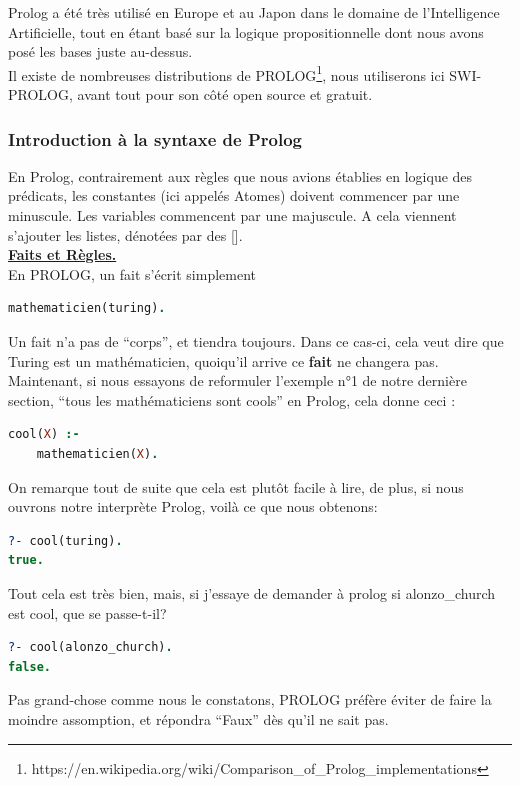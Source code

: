 \documentclass[a4paper, 12pt]{article}
\numberwithin{equation}{subsection}
\begin{document}
Prolog a été très utilisé en Europe et au Japon dans le domaine de l'Intelligence Artificielle, tout en étant basé sur la logique propositionnelle dont nous avons posé les bases juste au-dessus. \\

Il existe de nombreuses distributions de PROLOG\footnote{https://en.wikipedia.org/wiki/Comparison\_of\_Prolog\_implementations}, nous utiliserons ici SWI-PROLOG, avant tout pour son côté open source et gratuit.
\subsubsection{Introduction à la syntaxe de Prolog}
En Prolog, contrairement aux règles que nous avions établies en logique des prédicats, les constantes (ici appelés Atomes) doivent commencer par une minuscule. Les variables commencent par une majuscule. A cela viennent s'ajouter les listes, dénotées par des []. \\

\underline{{\bf Faits et Règles.}} \\[0.2cm]
En PROLOG, un fait s'écrit simplement \\
\begin{lstlisting}[language=Prolog]
mathematicien(turing).
\end{lstlisting}
Un fait n'a pas de ``corps'', et tiendra toujours. Dans ce cas-ci, cela veut dire que Turing est un mathématicien, quoiqu'il arrive ce {\bf fait} ne changera pas. \\

Maintenant, si nous essayons de reformuler l'exemple n°1 de notre dernière section, ``tous les mathématiciens sont cools'' en Prolog, cela donne ceci :
\begin{lstlisting}[language=Prolog]
cool(X) :-
    mathematicien(X).
\end{lstlisting}
On remarque tout de suite que cela est plutôt facile à lire, de plus, si nous ouvrons notre interprète Prolog, voilà ce que nous obtenons:
\begin{lstlisting}[language=Prolog]
?- cool(turing).
true.
\end{lstlisting}
Tout cela est très bien, mais, si j'essaye de demander à prolog si alonzo\_church est cool, que se passe-t-il?
\begin{lstlisting}[language=Prolog]
?- cool(alonzo_church).
false.
\end{lstlisting}
Pas grand-chose comme nous le constatons, PROLOG préfère éviter de faire la moindre assomption, et répondra ``Faux'' dès qu'il ne sait pas.\\
\end{document}
